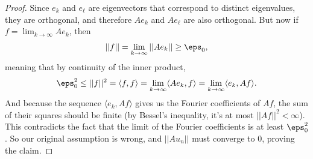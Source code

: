 \begin{proof}
Since $e_k$ and $e_\ell$ are eigenvectors that correspond to distinct eigenvalues, they are orthogonal, and therefore $Ae_k$ and $Ae_\ell$ are also orthogonal. But now if $f = \lim_{k \to \infty} Ae_k$, then 
\[
    ||f|| = \lim_{k \to \infty} ||Ae_k|| \ge \eps_0,
\]
meaning that by continuity of the inner product,
\[
    \eps_0^2 \le ||f||^2 = \langle f, f \rangle = \lim_{k \to \infty} \langle Ae_k, f \rangle = \lim_{k \to \infty} \langle e_k, Af \rangle.
\]
And because the sequence $\langle e_k, Af \rangle$ gives us the Fourier coefficients of $Af$, the sum of their squares should be finite (by Bessel's inequality, it's at most $||Af||^2 < \infty$). This contradicts the fact that the limit of the Fourier coefficients is at least $\eps_0^2$. So our original assumption is wrong, and $||Au_n||$ must converge to $0$, proving the claim.
\end{proof}